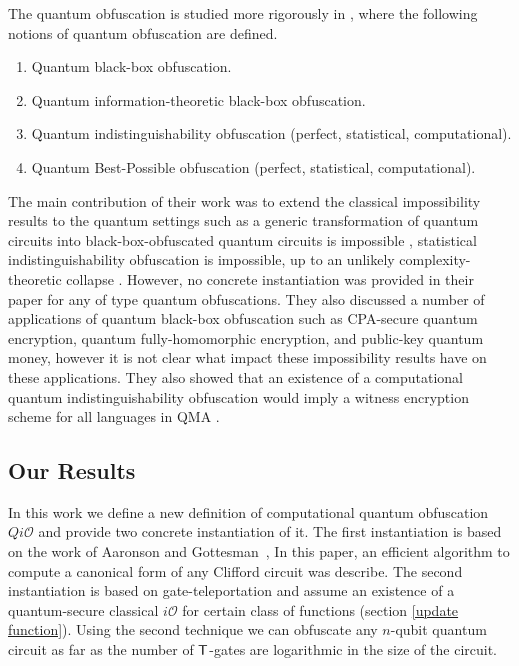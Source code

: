 The quantum obfuscation is studied more rigorously in \cite{AF16arxiv}, where the following notions of quantum obfuscation are defined.
\begin{enumerate}
\item Quantum black-box obfuscation.
\item Quantum information-theoretic black-box obfuscation.
\item Quantum indistinguishability obfuscation (perfect, statistical, computational).
\item Quantum Best-Possible obfuscation (perfect, statistical, computational).
\end{enumerate}

 The main contribution of their work was to extend the classical impossibility results to the quantum settings such as a generic transformation of quantum circuits into black-box-obfuscated quantum circuits is impossible \cite{AF16arxiv},  statistical indistinguishability obfuscation is impossible, up to an unlikely complexity-theoretic collapse \cite{AF16arxiv}. However, no concrete instantiation was provided in their paper for any of type quantum obfuscations. They also discussed a number of applications of quantum black-box obfuscation such as CPA-secure quantum encryption, quantum fully-homomorphic encryption, and public-key quantum money, however it is not clear what impact these impossibility results have on these applications. They also showed that an existence of a computational quantum indistinguishability obfuscation would imply a witness encryption scheme for all languages in QMA \cite{AF16arxiv}.


\subsection{Our Results}
In this work we define a new definition of computational quantum obfuscation $Qi\mathcal{O}$ and provide two concrete instantiation of it. The first instantiation is based on the work of Aaronson and Gottesman~\cite{AG04}, In this paper, an efficient algorithm to compute a canonical form of any Clifford circuit was describe. The second instantiation is based on gate-teleportation \cite{} and assume an existence of a quantum-secure classical $i\mathcal{O}$ for certain class of functions (section \ref{update function}). Using the second technique we can obfuscate any $n$-qubit quantum circuit as far as the number of ${\sf T}$-gates are logarithmic in the size of the circuit.



